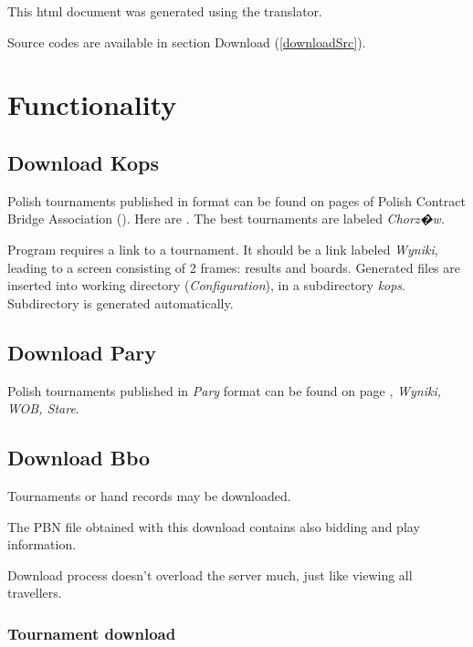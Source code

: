 \documentclass[polish,a4paper,11pt,oneside]{article}
\begin{document}
This html document was generated using the
 translator.

Source codes are available in section Download (\ref{downloadSrc}).

\section{Functionality}
\subsection{Download Kops} \label{pobKops}

Polish tournaments published in 
format can be found on pages of Polish Contract Bridge Association
().
Here are .
The best tournaments are labeled {\em Chorz�w}.

Program requires a link to a tournament.
It should be a link labeled {\em Wyniki},
leading to a screen consisting of 2 frames: results and boards.
Generated files are inserted into working directory ({\em Configuration}),
in a subdirectory {\em kops}. Subdirectory is generated automatically.

\subsection{Download Pary} \label{pobPary}

Polish tournaments published in {\em Pary}
format can be found on page
,
{\em Wyniki, WOB, Stare}.

\subsection{Download Bbo} \label{pobBbo}

Tournaments or hand records may be downloaded.

The PBN file obtained with this download contains also bidding and play
information.

Download process doesn't overload the server much, just like viewing
all travellers.

\subsubsection{Tournament download}
\end{document}
